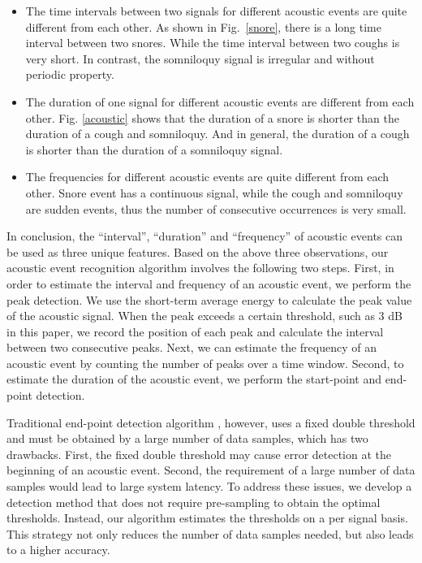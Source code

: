  \begin{itemize}
\item The time intervals between two signals for different acoustic events are quite different from each other. As shown in Fig.~\ref{snore}, there is a long time interval between two snores. While the time interval between two coughs is very short.  In contrast, the  somniloquy signal is irregular and without periodic property.
 \item The duration of one signal for different acoustic events are different from each other. Fig. \ref{acoustic} shows that the duration of a snore is shorter than the duration of a cough and somniloquy. And in general, the duration of a cough is shorter than the duration of a somniloquy signal.
\item The frequencies for different acoustic events are quite different from each other. Snore event has a continuous signal, while the  cough and somniloquy are sudden events, thus the number of consecutive occurrences is very small.
\end{itemize}
In conclusion, the ``interval'', ``duration'' and ``frequency'' of acoustic events can be used as three unique features. Based on the above three observations, our acoustic event recognition algorithm involves the following two steps. First, in order to estimate the interval and frequency of an acoustic event, we perform the peak detection. We use the short-term average energy to calculate the peak value of the acoustic signal. When the peak exceeds a certain threshold, such as 3 dB in this paper, we record the position of each peak and calculate the interval between two consecutive peaks. Next, we can estimate the frequency of an acoustic event by counting the number of peaks over a time window. Second, to estimate the duration of the acoustic event, we perform the start-point and end-point detection.

Traditional end-point detection algorithm \cite{stowell2015detection}, however, uses a fixed double threshold and must be obtained by a large number of data samples, which has two drawbacks. First, the fixed double threshold may cause error detection at the beginning of an acoustic event. Second, the requirement of a large number of data samples would lead to large system latency. To address these issues, we develop a detection method that does not require pre-sampling to obtain the optimal thresholds. Instead, our algorithm estimates the thresholds on a per signal basis. This strategy not only reduces the number of data samples needed, but also leads to a higher accuracy.


